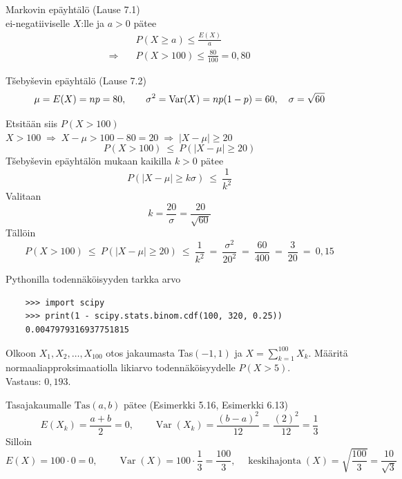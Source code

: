 \documentclass[12pt,a4paper]{article}
\begin{document}
\begin{kohta}
  \item Markovin epäyhtälö (Lause 7.1)\\
  ei-negatiiviselle $X$:lle ja $a>0$ pätee
  \[
  \begin{aligned}
  &P(X\ge a)\le \frac{E(X)}{a}\\
  \Rightarrow \quad &P(X> 100)\le \frac{80}{100}=0{,}80
  \end{aligned}
  \]


\item T\v{s}eby\v{s}evin epäyhtälö (Lause 7.2)\\


\[
\mu=E(X)=np=80,\qquad \sigma^2=\operatorname{Var}(X)=np(1-p)=60,\quad \sigma=\sqrt{60}
\]

Etsitään siis $P(X>100)$ \\
$X>100 \;\Rightarrow\; X-\mu > 100-80 = 20 \;\Rightarrow\; |X-\mu|\ge 20$
\[
P(X>100)\ \le\ P(|X-\mu|\ge 20)
\]
T\v{s}eby\v{s}evin epäyhtälön mukaan kaikilla $k>0$ pätee
\[
P(|X-\mu|\ge k\sigma)\ \le\ \frac{1}{k^2}
\]
Valitaan\\
\[
k=\dfrac{20}{\sigma}=\dfrac{20}{\sqrt{60}}
\]
Tällöin
\[
P(X>100)\ \le\ P(|X-\mu|\ge 20)
\ \le\ \frac{1}{k^2}
\ =\ \frac{\sigma^2}{20^2}
\ =\ \frac{60}{400}
\ =\ \frac{3}{20}
\ =\ 0{,}15
\]

\item Pythonilla todennäköisyyden tarkka arvo
\begin{verbatim}
    >>> import scipy
    >>> print(1 - scipy.stats.binom.cdf(100, 320, 0.25))
    0.0047979316937751815
\end{verbatim}
\end{kohta}





\pagebreak

Olkoon ${X_1, X_2,\ldots, X_{100}}$ otos jakaumasta Tas$(-1,1)$ ja $X=\sum_{k=1}^{100} X_k$. Määritä normaaliapproksimaatiolla likiarvo todennäköisyydelle $P(X>5)$.\\

Vastaus: $0{,}193$.
\vspace{0.4cm}

Tasajakaumalle $\mathrm{Tas}(a,b)$ pätee (Esimerkki 5.16, Esimerkki 6.13)
\[
E(X_k)=\frac{a+b}{2}=0,\qquad
\operatorname{Var}(X_k)=\frac{(b-a)^2}{12}=\frac{(2)^2}{12}=\frac{1}{3}
\]
Silloin
\[
E(X)=100\cdot 0=0,\qquad
\operatorname{Var}(X)=100\cdot \frac{1}{3}=\frac{100}{3},\quad
\operatorname{keskihajonta}(X)=\sqrt{\frac{100}{3}}=\frac{10}{\sqrt{3}}
\]
\end{document}
